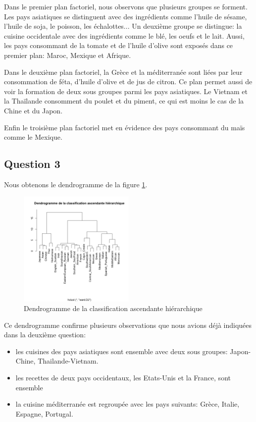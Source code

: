 \documentclass[a4paper,11pt,oneside,roman]{article}
\begin{document}
    Dans le premier plan factoriel, nous observons que plusieurs groupes se forment.
    Les pays asiatiques se distinguent avec des ingrédients comme l'huile de sésame, l'huile de soja, le poisson, les échalottes...
    Un deuxième groupe se distingue: la cuisine occidentale avec des ingrédients comme le blé, les oeufs et le lait.
    Aussi, les pays consommant de la tomate et de l'huile d'olive sont exposés dans ce premier plan: Maroc, Mexique et Afrique.

    Dans le deuxième plan factoriel, la Grèce et la méditerranée sont liées par leur consommation de féta, d'huile d'olive et de jus de citron. 
    Ce plan permet aussi de voir la formation de deux sous groupes parmi les pays asiatiques.
    Le Vietnam et la Thaïlande consomment du poulet et du piment, ce qui est moins le cas de la Chine et du Japon.

    Enfin le troisième plan factoriel met en évidence des pays consommant du maïs comme le Mexique.

    \subsection*{Question 3}
    Nous obtenons le dendrogramme de la figure \ref{fig_CAH_dendrogramme}.
    
    \begin{figure}
        \centering
        \includegraphics[width=0.5\textwidth]{imgs/CAH_dendrogramme.png}
        \caption{Dendrogramme de la classification ascendante hiérarchique}
        \label{fig_CAH_dendrogramme}
    \end{figure}

    Ce dendrogramme confirme plusieurs observations que nous avions déjà indiquées dans la deuxième question:
    \begin{itemize}
        \item les cuisines des pays asiatiques sont ensemble avec deux sous groupes: Japon-Chine, Thailande-Vietnam.
        \item les recettes de deux pays occidentaux, les Etats-Unis et la France, sont ensemble
        \item la cuisine méditerranée est regroupée avec les pays suivants: Grèce, Italie, Espagne, Portugal.
    \end{itemize}
\end{document}
